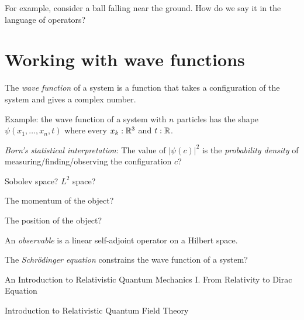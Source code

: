 For example, consider a ball falling near the ground.
How do we say it in the language of operators?

\section{Working with wave functions}

The \emph{wave function} of a system is a function that takes a configuration of the system and gives a complex number.

Example: the wave function of a system with \(n\) particles has the shape \(\psi(x_1,\ldots,x_n,t)\)
where every \(x_k : \mathbb{R}^3\) and \(t:\mathbb{R}\).

\emph{Born's statistical interpretation}:
The value of \( |\psi(c)|^2 \) is the \emph{probability density}
of measuring/finding/observing the configuration \(c\)?

Sobolev space?
\(L^2\) space?

The momentum of the object?

The position of the object?

An \emph{observable} is a linear self-adjoint operator on a Hilbert space.

The \emph{Schr\"odinger equation} constrains the wave function of a system?







An Introduction to Relativistic Quantum
Mechanics
I. From Relativity to Dirac Equation






Introduction to
Relativistic Quantum Field Theory



